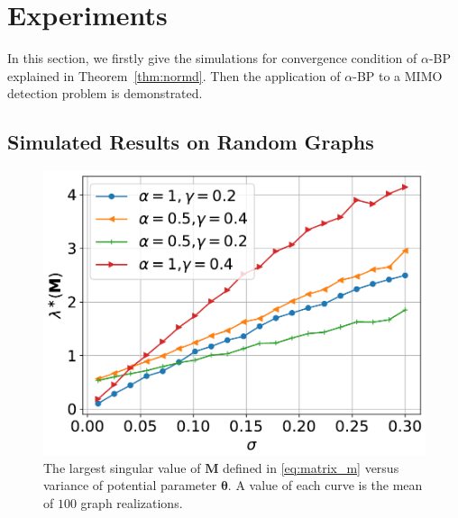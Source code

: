 



\section{Experiments}

In this section, we firstly give the simulations for convergence condition of $\alpha$-BP explained in Theorem~\ref{thm:normd}. Then the application of $\alpha$-BP to a MIMO detection problem is demonstrated.

\subsection{Simulated Results on Random Graphs}
\begin{figure}[!t]
  \centering
  \includegraphics[width=0.6\columnwidth]{figures/converge/contraction_vs_variance_r1-crop.pdf}
  \caption{The largest singular value of $\bm{M}$ defined in \eqref{eq:matrix_m} versus variance of potential parameter $\bm{\theta}$. A value of each curve is the mean of $100$ graph realizations.}
  \label{fig:largest_singular}
\end{figure}


